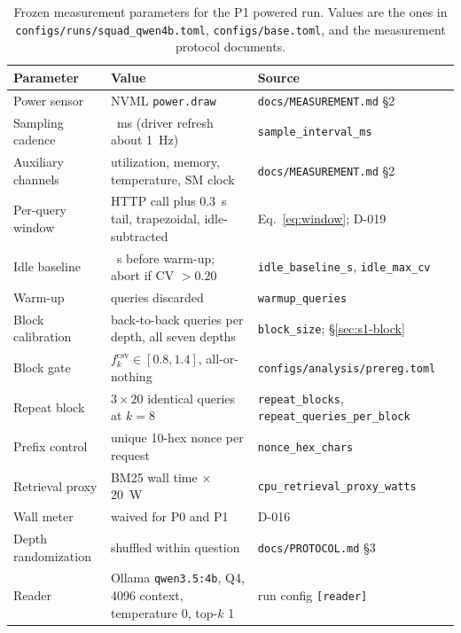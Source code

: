 \documentclass[a4paper,fleqn]{cas-sc}
\begin{document}
\begin{table}[pos=htbp]
  \centering
  \caption{Frozen measurement parameters for the P1 powered run. Values are the ones in
  \texttt{configs/runs/squad\_qwen4b.toml}, \texttt{configs/base.toml}, and the measurement
  protocol documents.}
  \label{tab:params}
  \begin{tabularx}{\textwidth}{>{\raggedright\arraybackslash}p{4.1cm}>{\raggedright\arraybackslash}p{5.6cm}X}
    \toprule
    \textbf{Parameter} & \textbf{Value} & \textbf{Source} \\
    \midrule
    Power sensor & NVML \texttt{power.draw} & \texttt{docs/MEASUREMENT.md} \S2 \\
    Sampling cadence & 100~ms (driver refresh about 1~Hz) & \texttt{sample\_interval\_ms} \\
    Auxiliary channels & utilization, memory, temperature, SM clock & \texttt{docs/MEASUREMENT.md} \S2 \\
    Per-query window & HTTP call plus 0.3~s tail, trapezoidal, idle-subtracted & Eq.~\ref{eq:window}; D-019 \\
    Idle baseline & 60~s before warm-up; abort if CV $>0.20$ & \texttt{idle\_baseline\_s}, \texttt{idle\_max\_cv} \\
    Warm-up & 20 queries discarded & \texttt{warmup\_queries} \\
    Block calibration & 20 back-to-back queries per depth, all seven depths & \texttt{block\_size}; \S\ref{sec:s1-block} \\
    Block gate & $f^{\mathrm{csv}}_k\in[0.8,1.4]$, all-or-nothing & \texttt{configs/analysis/prereg.toml} \\
    Repeat block & $3\times20$ identical queries at $k=8$ & \texttt{repeat\_blocks}, \texttt{repeat\_queries\_per\_block} \\
    Prefix control & unique 10-hex nonce per request & \texttt{nonce\_hex\_chars} \\
    Retrieval proxy & BM25 wall time $\times$ 20~W & \texttt{cpu\_retrieval\_proxy\_watts} \\
    Wall meter & waived for P0 and P1 & D-016 \\
    Depth randomization & shuffled within question & \texttt{docs/PROTOCOL.md} \S3 \\
    Reader & Ollama \texttt{qwen3.5:4b}, Q4, 4096 context, temperature 0, top-$k$ 1 & run config \texttt{[reader]} \\
    \bottomrule
  \end{tabularx}
\end{table}
\end{document}
